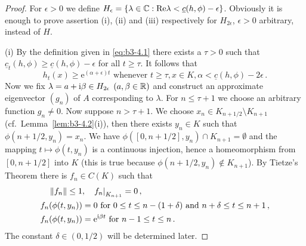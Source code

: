 \begin{proof}
	For $\epsilon > 0$ we define $H_{\epsilon} = \{\lambda \in \mathbb{C} : \mathop{}\!\mathrm{Re}\lambda < \underline{c}(h,\phi)-\epsilon\}$.
	Obviously it is enough to prove assertion (i), (ii) and (iii) respectively for $H_{2\epsilon}$, $\epsilon> 0$ arbitrary, instead of $H$.

	(i) By the definition given in \eqref{eq:b3-4.1} there exists a $\tau > 0$ such that $\underline{c}_{t}(h,\phi) \geq \underline{c}(h,\phi) - \epsilon$ for all $t \geq \tau$.
	It follows that
	\begin{equation}\label{eq:b3-4.5}
		h_{t}(x) \geq \mathrm{e}^{(\alpha + \epsilon)t} \text{ whenever } t \geq \tau, x \in K, \alpha < \underline{c}(h,\phi)-2\epsilon \,.
	\end{equation}
	Now we fix $\lambda = a + \mathrm{i}\beta \in H_{2\epsilon}$ $(a,\beta \in \mathbb{R})$ and construct an approximate eigenvector $(g_{n})$ of $A$ corresponding to $\lambda$.
	For $n \leq \tau + 1$ we choose an arbitrary function $g_{n} \neq 0$.
	Now suppose $n > \tau + 1$.
	We choose $x_{n} \in K_{n+1/2} \setminus K_{n+1}$ (cf.\ Lemma~\ref{lem:b3-4.2}(i)), then there exists $y_{n} \in K$ such that $\phi(n+1/2,y_{n}) = x_{n}$.
	We have $\phi([0,n+1/2],y_{n}) \cap K_{n+1} = \emptyset$ and the mapping $t \mapsto \phi(t,y_{n})$ is a continuous injection, hence a homeomorphism from $[0,n+1/2]$ into $K$ (this is true because $\phi(n+1/2,y_{n}) \notin K_{n+1}$).
	By Tietze's Theorem there is $f_{n} \in C(K)$ such that
	\begin{equation}\label{eq:b3-4.6}
		\begin{aligned}
			\|f_{n}\| \leq 1 &, \quad {f_{n}|}_{K_{n+1}} = 0\,, \\
			f_{n}(\phi(t,y_{n})) &= 0 \text{ for } 0 \leq t \leq n-(1+\delta) \text{ and } n+\delta \leq t \leq n+1\,, \\
			f_{n}(\phi(t,y_{n})) &= \mathrm{e}^{\mathrm{i}\beta  t} \text{ for } n-1 \leq t \leq n \,.
		\end{aligned}
	\end{equation}
	The constant $\delta \in (0,1/2)$ will be determined later.
	

\end{proof}
